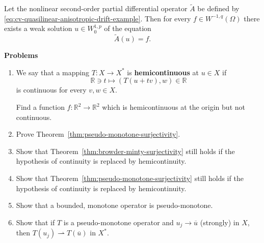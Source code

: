 \begin{Theorem}
\label{thm:cv-quasilinear-anisotropic-drift-existence}
Let the nonlinear second-order partial differential operator $\widetilde A$ be defined by \eqref{eq:cv-quasilinear-anisotropic-drift-example}. Then for every $f\in W^{-1,q}(\Omega)$ there exists a weak solution $u\in W_0^{1,p}$ of the equation
\begin{equation}\label{eq:cv-quasilinear-anisotropic-drift-existence-equation}
\widetilde A(u)=f.
\end{equation}

\end{Theorem}

\textbf{Problems}

\begin{enumerate}[label=\thesection.\arabic*.,ref=\thesection.\arabic*,start=16,series=book-problems]

\item\label{ex:hemicontinuity-not-continuity-origin} We say that a mapping $T:X\to X^*$ is \textbf{hemicontinuous} at $u\in X$ if
\begin{equation}\label{eq:hemicontinuity-scalar-pairing-along-line}
\mathbb{R}\ni t\mapsto(T(u+tv),w)\in\mathbb{R}
\end{equation}
is continuous for every $v,w\in X$.\par Find a function $f:\mathbb{R}^2\to\mathbb{R}^2$ which is hemicontinuous at the origin but not continuous.

\item\label{ex:pseudo-monotone-surjectivity-proof} Prove Theorem~\ref{thm:pseudo-monotone-surjectivity}.

\item\label{ex:browder-minty-hemicontinuity-surjectivity} Show that Theorem~\ref{thm:browder-minty-surjectivity} still holds if the hypothesis of continuity is replaced by hemicontinuity.

\item\label{ex:pseudo-monotone-hemicontinuity-surjectivity} Show that Theorem~\ref{thm:pseudo-monotone-surjectivity} still holds if the hypothesis of continuity is replaced by hemicontinuity.

\item\label{ex:bounded-monotone-implies-pseudo-monotone} Show that a bounded, monotone operator is pseudo-monotone.

\item\label{ex:pseudo-monotone-strong-to-weak-continuity} Show that if $T$ is a pseudo-monotone operator and $u_j\to\overline u$ (strongly) in $X$, then $T(u_j)\rightharpoonup T(\overline u)$ in $X^*$.


\end{enumerate}
